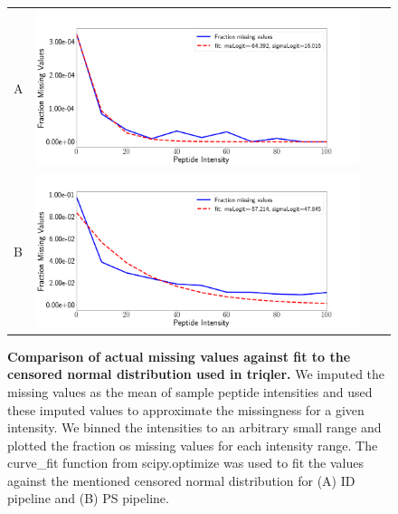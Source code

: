 \documentclass[11pt]{article}
\begin{document}
\begin{figure}[hbt]
    \centering
    \centering
    \begin{tabular}{lclc} 
        A & \includegraphics[width=0.80\linewidth]{../../result/report_plots_pipeline/fraction_missing_values_ID.png} \\ %
        B & \includegraphics[width=0.80\linewidth]{../../result/report_plots_pipeline/fraction_missing_values_PS.png} \\%
    \end{tabular}
    \caption{{\bf Comparison of actual missing values against fit to the censored normal distribution used in triqler.} We imputed the missing values as the mean of sample peptide intensities and used these imputed values to approximate the missingness for a given intensity. We binned the intensities to an arbitrary small range and plotted the fraction os missing values for each intensity range. The curve\_fit function from scipy.optimize was used to fit the values against the mentioned censored normal distribution for (A) ID pipeline  and (B) PS pipeline. \label{fig:fraction_missing_values}}
\end{figure}
\end{document}
